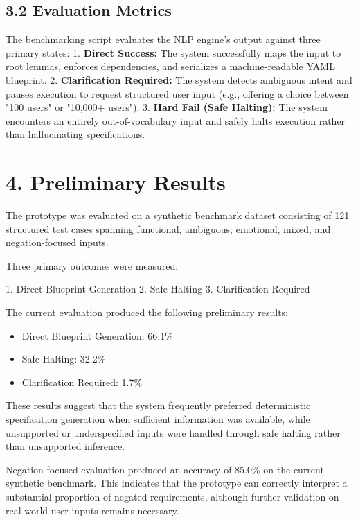 \documentclass[11pt,a4paper]{article}
\begin{document}
\subsection{3.2 Evaluation Metrics}
The benchmarking script evaluates the NLP engine's output against three primary states:
1. \textbf{Direct Success:} The system successfully maps the input to root lemmas, enforces dependencies, and serializes a machine-readable YAML blueprint.
2. \textbf{Clarification Required:} The system detects ambiguous intent and pauses execution to request structured user input (e.g., offering a choice between "100 users" or "10,000+ users").
3. \textbf{Hard Fail (Safe Halting):} The system encounters an entirely out-of-vocabulary input and safely halts execution rather than hallucinating specifications.



\section{4. Preliminary Results}

The prototype was evaluated on a synthetic benchmark dataset consisting of 121 structured test cases spanning functional, ambiguous, emotional, mixed, and negation-focused inputs.

Three primary outcomes were measured:

1. Direct Blueprint Generation
2. Safe Halting
3. Clarification Required

The current evaluation produced the following preliminary results:

\begin{itemize}
    \item Direct Blueprint Generation: 66.1\%
    \item Safe Halting: 32.2\%
    \item Clarification Required: 1.7\%
\end{itemize}

These results suggest that the system frequently preferred deterministic specification generation when sufficient information was available, while unsupported or underspecified inputs were handled through safe halting rather than unsupported inference.

Negation-focused evaluation produced an accuracy of 85.0\% on the current synthetic benchmark. This indicates that the prototype can correctly interpret a substantial proportion of negated requirements, although further validation on real-world user inputs remains necessary.
\end{document}
